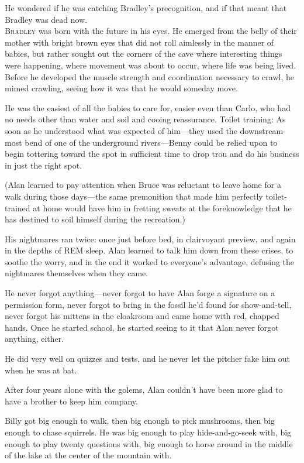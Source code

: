 He wondered if he was catching Bradley's precognition, and if that
meant that Bradley was dead now.
\\
\lettrine[lines=3, lhang=.5, nindent=0pt, findent=2pt]{B}{radley} was born with the future in his eyes.  He emerged from the
belly of their mother with bright brown eyes that did not roll
aimlessly in the manner of babies, but rather sought out the corners
of the cave where interesting things were happening, where movement
was about to occur, where life was being lived.  Before he developed
the muscle strength and coordination necessary to crawl, he mimed
crawling, seeing how it was that he would someday move.

He was the easiest of all the babies to care for, easier even than
Carlo, who had no needs other than water and soil and cooing
reassurance.  Toilet training:  As soon as he understood what was
expected of him---they used the downstream-most bend of one of the
underground rivers---Benny could be relied upon to begin tottering
toward the spot in sufficient time to drop trou and do his business in
just the right spot.

(Alan learned to pay attention when Bruce was reluctant to leave home
for a walk during those days---the same premonition that made him
perfectly toilet-trained at home would have him in fretting sweats at
the foreknowledge that he has destined to soil himself during the
recreation.)

His nightmares ran twice:  once just before bed, in clairvoyant
preview, and again in the depths of REM sleep.  Alan learned to talk
him down from these crises, to soothe the worry, and in the end it
worked to everyone's advantage, defusing the nightmares themselves
when they came.

He never forgot anything---never forgot to have Alan forge a signature
on a permission form, never forgot to bring in the fossil he'd found
for show-and-tell, never forgot his mittens in the cloakroom and came
home with red, chapped hands.  Once he started school, he started
seeing to it that Alan never forgot anything, either.

He did very well on quizzes and tests, and he never let the pitcher
fake him out when he was at bat.

After four years alone with the golems, Alan couldn't have been more
glad to have a brother to keep him company.

Billy got big enough to walk, then big enough to pick mushrooms, then
big enough to chase squirrels.  He was big enough to play
hide-and-go-seek with, big enough to play twenty questions with, big
enough to horse around in the middle of the lake at the center of the
mountain with.

